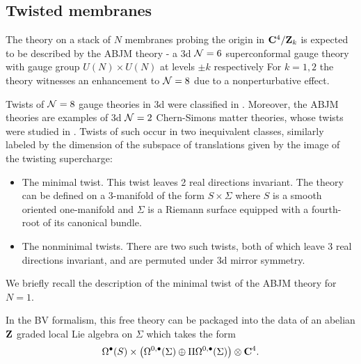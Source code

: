 \documentclass[11pt]{amsart}%
\begin{document}
\subsection{Twisted membranes}

The theory on a stack of $N$ membranes probing the origin in $\mathbf{C}^{4}/\mathbf{Z}_{k}$ is expected to be described by the ABJM theory - a 3d $\mathcal N=6$ superconformal gauge theory with gauge group $U(N)\times U(N)$ at levels $\pm k$ respectively \cite{} For $k=1,2$ the theory witnesses an enhancement to $\mathcal N=8$ due to a nonperturbative effect. \cite{}

Twists of $\mathcal N=8$ gauge theories in 3d were classified in \cite{}. Moreover, the ABJM theories are examples of 3d $\mathcal N=2$ Chern-Simons matter theories, whose twists were studied in \cite{}. Twists of such occur in two inequivalent classes, similarly labeled by the dimension of the subspace of translations given by the image of the twisting supercharge:

\begin{itemize}
  \item The minimal twist. This twist leaves 2 real directions invariant. The theory can be defined on a 3-manifold of the form $S\times \Sigma$ where $S$ is a smooth oriented one-manifold and $\Sigma$ is a Riemann surface equipped with a fourth-root of its canonical bundle.

  \item The nonminimal twists. There are two such twists, both of which leave 3 real directions invariant, and are permuted under 3d mirror symmetry.
\end{itemize}

\parsec

We briefly recall the description of the minimal twist of the ABJM theory for $N=1$.


In the BV formalism, this free theory can be packaged into the data of an abelian $\mathbf{Z}$ graded local Lie algebra on $\Sigma$ which takes the form
\[
\Omega^{\bullet}(S)\times \left (\Omega^{0,\bullet}(\Sigma) \oplus \Pi \Omega^{0,\bullet} (\Sigma )\right ) \otimes \mathbf{C}^{4}.
\]
\end{document}
